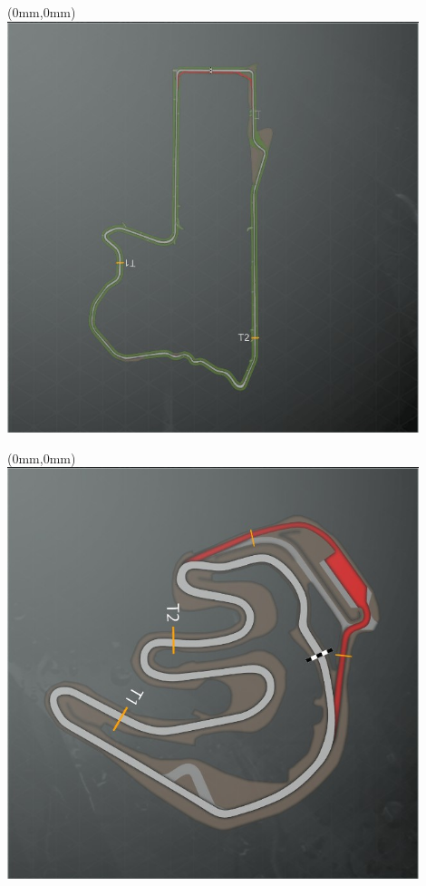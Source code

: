 \null\newpage
\begin{textblock*}{30mm}(0mm,0mm)%
\includegraphics[width=120mm]{TR/2015-05-20_00036.png}
\end{textblock*}
\null\newpage
\begin{textblock*}{30mm}(0mm,0mm)%
\includegraphics[width=120mm]{TR/2015-05-20_00069.png}
\end{textblock*}
